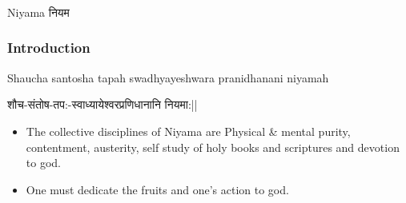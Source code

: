 \begin{frame}[fragile]\frametitle{}
\begin{center}
{\Large Niyama नियम}
\end{center}
\end{frame}


\begin{frame}[fragile]\frametitle{Introduction}

Shaucha santosha tapah swadhyayeshwara pranidhanani niyamah

शौच-संतोष-तप:-स्वाध्यायेश्वरप्रणिधानानि नियमा:||

	\begin{itemize}
	\item The  collective  disciplines  of 
Niyama  are  Physical  \&  mental 
purity, contentment, austerity,
self  study  of  holy  books  and 
scriptures and devotion to god. 
\item One  must  dedicate  the  fruits 
and one’s action to god.
	\end{itemize}

\end{frame}

